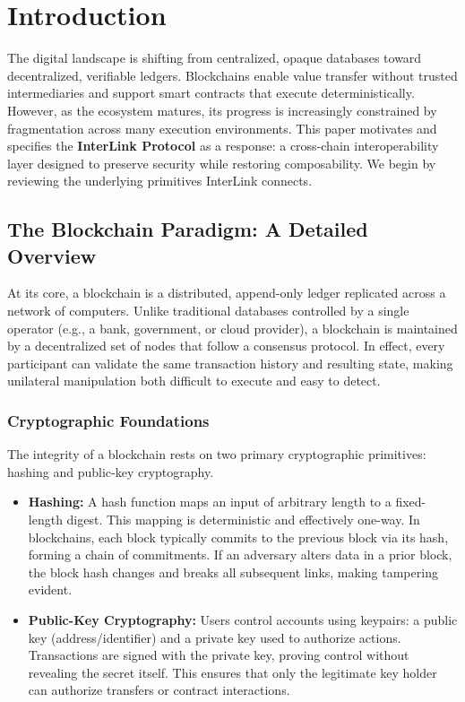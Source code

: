 \documentclass[11pt,a4paper]{article}
\begin{document}
\newpage

\section{Introduction}
\label{sec:intro}

 The digital landscape is shifting from centralized, opaque databases toward decentralized, verifiable ledgers. Blockchains enable value transfer without trusted intermediaries and support smart contracts that execute deterministically. However, as the ecosystem matures, its progress is increasingly constrained by fragmentation across many execution environments. This paper motivates and specifies the \textbf{InterLink Protocol} as a response: a cross-chain interoperability layer designed to preserve security while restoring composability. We begin by reviewing the underlying primitives InterLink connects.

\subsection{The Blockchain Paradigm: A Detailed Overview}
At its core, a blockchain is a distributed, append-only ledger replicated across a network of computers. Unlike traditional databases controlled by a single operator (e.g., a bank, government, or cloud provider), a blockchain is maintained by a decentralized set of nodes that follow a consensus protocol. In effect, every participant can validate the same transaction history and resulting state, making unilateral manipulation both difficult to execute and easy to detect.

\subsubsection{Cryptographic Foundations}
The integrity of a blockchain rests on two primary cryptographic primitives: hashing and public-key cryptography.
\begin{itemize}
    \item \textbf{Hashing:} A hash function maps an input of arbitrary length to a fixed-length digest. This mapping is deterministic and effectively one-way. In blockchains, each block typically commits to the previous block via its hash, forming a chain of commitments. If an adversary alters data in a prior block, the block hash changes and breaks all subsequent links, making tampering evident.
    \item \textbf{Public-Key Cryptography:} Users control accounts using keypairs: a public key (address/identifier) and a private key used to authorize actions. Transactions are signed with the private key, proving control without revealing the secret itself. This ensures that only the legitimate key holder can authorize transfers or contract interactions.
\end{itemize}
\end{document}
